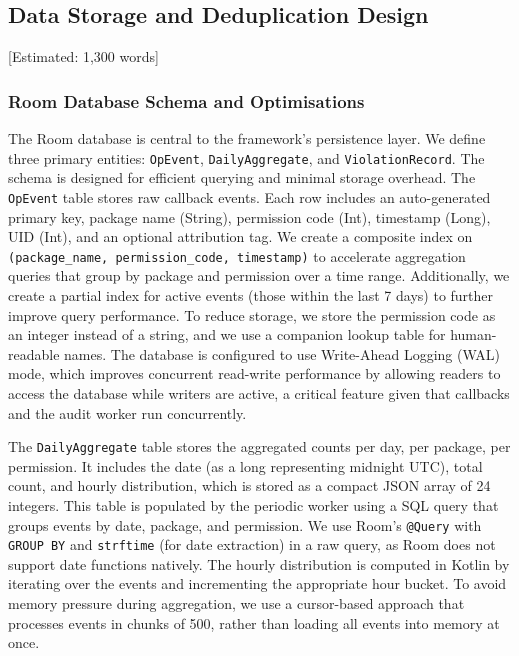 \subsection{Data Storage and Deduplication Design} [Estimated: 1,300 words]

\subsubsection{Room Database Schema and Optimisations}

The Room database is central to the framework's persistence layer. We define three primary entities: \texttt{OpEvent}, \texttt{DailyAggregate}, and \texttt{ViolationRecord}. The schema is designed for efficient querying and minimal storage overhead. The \texttt{OpEvent} table stores raw callback events. Each row includes an auto-generated primary key, package name (String), permission code (Int), timestamp (Long), UID (Int), and an optional attribution tag. We create a composite index on \texttt{(package\_name, permission\_code, timestamp)} to accelerate aggregation queries that group by package and permission over a time range. Additionally, we create a partial index for active events (those within the last 7 days) to further improve query performance. To reduce storage, we store the permission code as an integer instead of a string, and we use a companion lookup table for human-readable names. The database is configured to use Write-Ahead Logging (WAL) mode, which improves concurrent read-write performance by allowing readers to access the database while writers are active, a critical feature given that callbacks and the audit worker run concurrently.

The \texttt{DailyAggregate} table stores the aggregated counts per day, per package, per permission. It includes the date (as a long representing midnight UTC), total count, and hourly distribution, which is stored as a compact JSON array of 24 integers. This table is populated by the periodic worker using a SQL query that groups events by date, package, and permission. We use Room's \texttt{@Query} with \texttt{GROUP BY} and \texttt{strftime} (for date extraction) in a raw query, as Room does not support date functions natively. The hourly distribution is computed in Kotlin by iterating over the events and incrementing the appropriate hour bucket. To avoid memory pressure during aggregation, we use a cursor-based approach that processes events in chunks of 500, rather than loading all events into memory at once.

